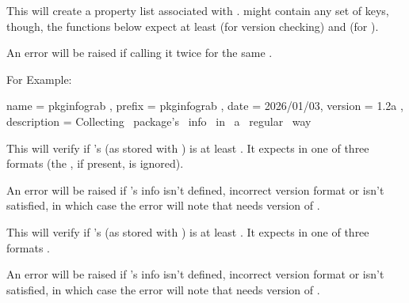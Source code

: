 \documentclass[10pt]{article}
\begin{document}
\begin{codedescribe}{\PkgInfoSet}
\begin{codesyntax}%
\end{codesyntax}
This will create a property list associated with .  might contain any set of keys, though, the functions below expect at least  (for version checking) and  (for \tsobj{\PkgInfoDescription}).
\end{codedescribe}
\begin{tsremark}
  An error will be raised if calling it twice for the same .
\end{tsremark}
For Example:
\begin{codestore}[demoB]
  { 
    name         = {pkginfograb} ,
    prefix       = {pkginfograb} ,
    date         = {2026/01/03},
    version      = {1.2a} ,
    description  = {Collecting~ package's~ info~ in~ a~ regular~ way}
  }
\end{codestore}


\begin{codedescribe}{\PkgInfoReqVersion}
\begin{codesyntax}%
\end{codesyntax}
This will verify if 's  (as stored with \tsobj{\PkgInfoSet}) is at least . It expects  in one of three formats  (the \tsobj[key]{[v]}, if present, is ignored).
\end{codedescribe}
\begin{tsremark}
  An error will be raised if 's info isn't defined, incorrect version format or  isn't satisfied, in which case the error will note that  needs version  of .
\end{tsremark}


\begin{codedescribe}{\PkgInfoReqDate}
\begin{codesyntax}%
\end{codesyntax}
This will verify if 's  (as stored with \tsobj{\PkgInfoSet}) is at least . It expects  in one of three formats  .
\end{codedescribe}
\begin{tsremark}
  An error will be raised if 's info isn't defined, incorrect version format or  isn't satisfied, in which case the error will note that  needs version  of .
\end{tsremark}
\end{document}
